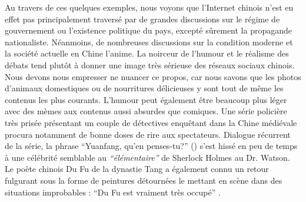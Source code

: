 Au travers de ces quelques exemples, nous voyons que l'Internet chinois n'est en effet pas principalement traversé par de grandes discussions sur le régime de gouvernement ou l'existence politique du pays, excepté sûrement la propagande nationaliste. Néanmoins, de nombreuses discussions sur la condition moderne et la société actuelle en Chine l'anime. La noirceur de l'humour et le réalisme des débats tend plutôt à donner une image très sérieuse des réseaux sociaux chinois. Nous devons nous empresser ne nuancer ce propos, car nous savons que les photos d'animaux domestiques ou de nourritures délicieuses y sont tout de même les contenus les plus courants. L'humour peut également être beaucoup plus léger avec des mèmes aux contenus aussi absurdes que comiques. Une série policière très prisée présentant un couple de détectives enquêtant dans la Chine médiévale procura notamment de bonne doses de rire aux spectateurs. Dialogue récurrent de la série, la phrase ``Yuanfang, qu'en penses-tu?'' () s'est hissé en peu de temps à une célébrité semblable au \textit{``élémentaire''} de Sherlock Holmes au Dr. Watson. Le poète chinois Du Fu de la dynastie Tang a également connu un retour fulgurant sous la forme de peintures détournées le mettant en scène dans des situations improbables : ``Du Fu est vraiment très occupé'' . 

